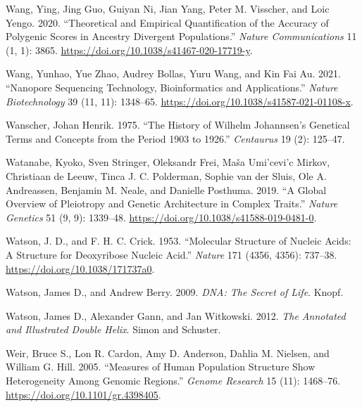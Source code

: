 \documentclass[
]{book}
\newlength{\cslhangindent}
\newlength{\cslentryspacingunit} %
\newenvironment{CSLReferences}[2] %
 {%
  \setlength{\parindent}{0pt}
  \ifodd #1
  \let\oldpar\par
  \def\par{\hangindent=\cslhangindent\oldpar}
  \fi
  \setlength{\parskip}{#2\cslentryspacingunit}
 }%
 {}
\begin{document}
\begin{CSLReferences}{1}{0}
\leavevmode{}%
Wang, Ying, Jing Guo, Guiyan Ni, Jian Yang, Peter M. Visscher, and Loic Yengo. 2020. {``Theoretical and Empirical Quantification of the Accuracy of Polygenic Scores in Ancestry Divergent Populations.''} \emph{Nature Communications} 11 (1, 1): 3865. \url{https://doi.org/10.1038/s41467-020-17719-y}.

\leavevmode{}%
Wang, Yunhao, Yue Zhao, Audrey Bollas, Yuru Wang, and Kin Fai Au. 2021. {``Nanopore Sequencing Technology, Bioinformatics and Applications.''} \emph{Nature Biotechnology} 39 (11, 11): 1348--65. \url{https://doi.org/10.1038/s41587-021-01108-x}.

\leavevmode{}%
Wanscher, Johan Henrik. 1975. {``The History of {Wilhelm Johannsen}'s Genetical Terms and Concepts from the Period 1903 to 1926.''} \emph{Centaurus} 19 (2): 125--47.

\leavevmode{}%
Watanabe, Kyoko, Sven Stringer, Oleksandr Frei, Maša Umi'cevi'c Mirkov, Christiaan de Leeuw, Tinca J. C. Polderman, Sophie van der Sluis, Ole A. Andreassen, Benjamin M. Neale, and Danielle Posthuma. 2019. {``A Global Overview of Pleiotropy and Genetic Architecture in Complex Traits.''} \emph{Nature Genetics} 51 (9, 9): 1339--48. \url{https://doi.org/10.1038/s41588-019-0481-0}.

\leavevmode{}%
Watson, J. D., and F. H. C. Crick. 1953. {``Molecular {Structure} of {Nucleic Acids}: {A Structure} for {Deoxyribose Nucleic Acid}.''} \emph{Nature} 171 (4356, 4356): 737--38. \url{https://doi.org/10.1038/171737a0}.

\leavevmode{}%
Watson, James D., and Andrew Berry. 2009. \emph{{DNA}: {The} Secret of Life}. {Knopf}.

\leavevmode{}%
Watson, James D., Alexander Gann, and Jan Witkowski. 2012. \emph{The Annotated and Illustrated Double Helix}. {Simon and Schuster}.

\leavevmode{}%
Weir, Bruce S., Lon R. Cardon, Amy D. Anderson, Dahlia M. Nielsen, and William G. Hill. 2005. {``Measures of Human Population Structure Show Heterogeneity Among Genomic Regions.''} \emph{Genome Research} 15 (11): 1468--76. \url{https://doi.org/10.1101/gr.4398405}.


\end{CSLReferences}
\end{document}
